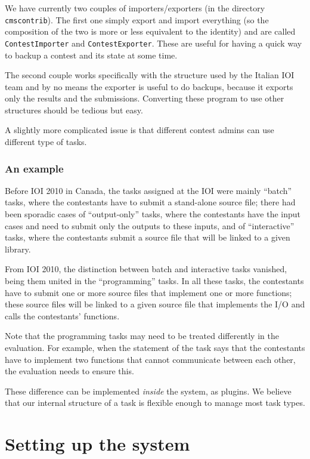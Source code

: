 \documentclass[a4paper,8pt]{amsart}
\newcommand{\file}[1]{\texttt{#1}}
\begin{document}
\begin{multicols}{2}
  We have currently two couples of importers/exporters (in the
  directory \file{cmscontrib}). The first one simply export and import
  everything (so the composition of the two is more or less equivalent
  to the identity) and are called \file{ContestImporter} and
  \file{ContestExporter}. These are useful for having a quick way to
  backup a contest and its state at some time.

  The second couple works specifically with the structure used by the
  Italian IOI team and by no means the exporter is useful to do
  backups, because it exports only the results and the submissions.
  Converting these program to use other structures should be tedious
  but easy.

  A slightly more complicated issue is that different contest admins
  can use different type of tasks.

  \subsubsection{An example}

  Before IOI 2010 in Canada, the tasks assigned at the IOI were mainly
  ``batch'' tasks, where the contestants have to submit a stand-alone
  source file; there had been sporadic cases of ``output-only'' tasks,
  where the contestants have the input cases and need to submit only
  the outputs to these inputs, and of ``interactive'' tasks, where the
  contestants submit a source file that will be linked to a given
  library.

  From IOI 2010, the distinction between batch and interactive tasks
  vanished, being them united in the ``programming'' tasks. In all
  these tasks, the contestants have to submit one or more source files
  that implement one or more functions; these source files will be
  linked to a given source file that implements the I/O and calls the
  contestants' functions.

  Note that the programming tasks may need to be treated differently
  in the evaluation. For example, when the statement of the task says
  that the contestants have to implement two functions that cannot
  communicate between each other, the evaluation needs to ensure this.

  These difference can be implemented \emph{inside} the system, as
  plugins. We believe that our internal structure of a task is
  flexible enough to manage most task types.

  \section{Setting up the system}


\end{multicols}
\end{document}
